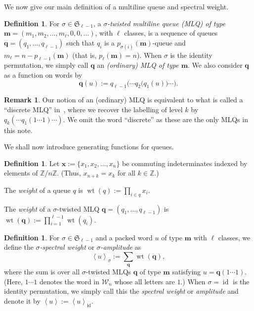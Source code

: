 \documentclass[reqno]{amsart}%
\newcommand{\0}{\phantom{c}}
\DeclareMathOperator{\wt}{wt}
\DeclareMathOperator{\id}{id}
\newcommand{\mm}{\mathbf{m}}
\let\sumnonlimits\sum
\let\prodnonlimits\prod
\renewcommand{\sum}{\sumnonlimits\limits}
\renewcommand{\prod}{\prodnonlimits\limits}
\newcommand{\tup}[1]{\left( #1 \right)}
\newcommand{\defn}[1]{{\color{darkred}\emph{#1}}}
\theoremstyle{plain}
\theoremstyle{definition}
\newtheorem{dfn}[thm]{Definition}
\newtheorem{remark}[thm]{Remark}
\numberwithin{equation}{section}
\begin{document}
We now give our main definition of a multiline queue and spectral weight.

\begin{dfn}
For $\sigma\in\mathfrak{S}_{\ell-1}$, a
\defn{$\sigma$-twisted multiline queue (MLQ) of type $\mm = \tup{m_1, m_2, \ldots, m_\ell, 0, 0, \ldots}$},
with $\ell$ classes, is a sequence of queues $\mathbf{q} = (q_{1}, \dotsc,
q_{\ell-1})$ such that $q_{i}$ is a $p_{\sigma(i)}(\mathbf{m})$-queue and
$m_{\ell} = n - p_{\ell-1}(\mathbf{m})$ (that is, $p_{\ell}(\mathbf{m}) = n$).
When $\sigma$ is the identity permutation, we simply call $\mathbf{q}$ an
\defn{(ordinary) MLQ of type $\mm$}. We also consider $\mathbf{q}$ as a
function on words by
\[
\mathbf{q}(u) := q_{\ell-1}\bigl( \cdots q_{2}\bigl( q_{1}(u) \bigr) \cdots
\bigr).
\]

\end{dfn}

\begin{remark}
Our notion of an (ordinary) MLQ is equivalent to what is called a ``discrete
MLQ'' in~\cite[\S 2.2]{AasLin17}, where we recover the labelling of level $k$
by $q_{k}( \cdots q_{1}(1 \dotsm1) \cdots)$. We omit the word ``discrete'' as
these are the only MLQs in this note.
\end{remark}

We shall now introduce generating functions for queues.

\begin{dfn}
Let $\mathbf{x} := \{x_{1}, x_{2}, \ldots, x_{n}\}$ be commuting
indeterminates indexed by elements of $\mathbb{Z} / n \mathbb{Z}$. (Thus,
$x_{n+k} = x_{k}$ for all $k \in\mathbb{Z}$.)

The \defn{weight} of a queue $q$ is $\wt(q) := \prod_{i \in q} x_{i}$.

The \defn{weight} of a $\sigma$-twisted MLQ $\mathbf{q} = (q_{1}, \dotsc,
q_{\ell-1})$ is $\wt(\mathbf{q}) := \prod_{i=1}^{\ell-1} \wt(q_{i})$.
\end{dfn}

\begin{dfn}
For $\sigma\in\mathfrak{S}_{\ell-1}$ and a packed word $u$ of type
$\mathbf{m}$ with $\ell$ classes, we define the
\defn{$\sigma$-spectral weight} or \defn{$\sigma$-amplitude} as
\begin{equation}
\label{eq:amplitude}\left\langle u \right\rangle _{\sigma} := \sum
_{\mathbf{q}} \wt(\mathbf{q}),
\end{equation}
where the sum is over all $\sigma$-twisted MLQs $\mathbf{q}$ of type
$\mathbf{m}$ satisfying $u = \mathbf{q}(1 \dotsm1)$. (Here, $1 \dotsm1$
denotes the word in $\mathcal{W}_{n}$ whose all letters are $1$.) When
$\sigma= \id$ is the identity permutation, we simply call this the
\defn{spectral weight} or \defn{amplitude} and denote it by $\left\langle u
\right\rangle := \left\langle u \right\rangle _{\id}$.
\end{dfn}
\end{document}
